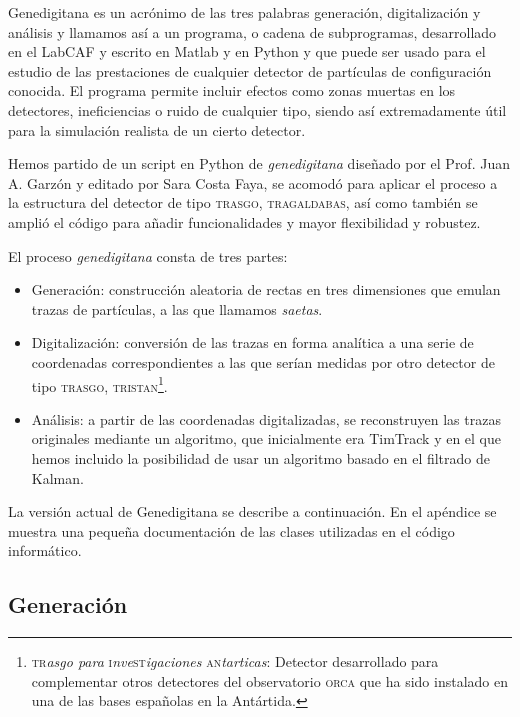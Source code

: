 \documentclass[a4paper]{article}
\begin{document}
Genedigitana es un acrónimo de las tres palabras generación, digitalización y análisis y llamamos así a un programa,  o cadena de subprogramas, desarrollado en el LabCAF y escrito en \textsf{Matlab} y en \textsf{Python} y que puede ser usado para el estudio de las prestaciones de cualquier detector de partículas de configuración conocida. El programa permite incluir efectos como zonas muertas en los detectores, ineficiencias o ruido de cualquier tipo, siendo así extremadamente útil para la simulación realista de un cierto detector. 

Hemos partido de un script en \textsf{Python} de \textit{genedigitana} diseñado por el Prof. Juan A. Garzón y editado por Sara Costa Faya, se acomodó para aplicar el proceso a la estructura del detector de tipo \textsc{trasgo}, \textsc{tragaldabas}, así como también se amplió el código para añadir funcionalidades y mayor flexibilidad y robustez.

El proceso \textit{genedigitana} consta de tres partes:
\begin{itemize}
    \item Generación: construcción aleatoria de rectas en tres dimensiones que emulan trazas de partículas, a las que llamamos \textit{saetas}.
    \item Digitalización: conversión de las trazas en forma analítica a una serie de coordenadas correspondientes a las que serían medidas por otro detector de tipo \textsc{trasgo}, \textsc{tristan}\footnote{\textsc{tr}\textit{asgo para} \textsc{i}\textit{nve}\textsc{st}\textit{igaciones}  \textsc{an}\textit{tarticas}: Detector desarrollado para complementar otros detectores del observatorio \textsc{orca} que ha sido instalado en una de las bases españolas en la Antártida.}.
    \item Análisis: a partir de las coordenadas digitalizadas, se reconstruyen las trazas originales mediante un algoritmo, que inicialmente era TimTrack y en el que hemos incluido la posibilidad de usar un algoritmo basado en el filtrado de Kalman.
\end{itemize}

La versión actual de Genedigitana se describe a continuación. En el apéndice se muestra una pequeña documentación de las clases utilizadas en el código informático.

\subsection{Generación}
\end{document}
